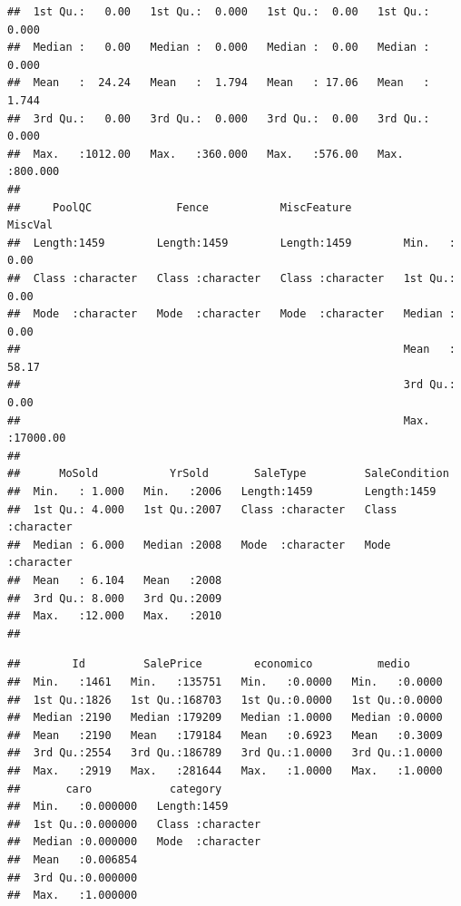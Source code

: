 \documentclass[
]{article}
\begin{document}
\begin{verbatim}
##  1st Qu.:   0.00   1st Qu.:  0.000   1st Qu.:  0.00   1st Qu.:  0.000  
##  Median :   0.00   Median :  0.000   Median :  0.00   Median :  0.000  
##  Mean   :  24.24   Mean   :  1.794   Mean   : 17.06   Mean   :  1.744  
##  3rd Qu.:   0.00   3rd Qu.:  0.000   3rd Qu.:  0.00   3rd Qu.:  0.000  
##  Max.   :1012.00   Max.   :360.000   Max.   :576.00   Max.   :800.000  
##                                                                        
##     PoolQC             Fence           MiscFeature           MiscVal        
##  Length:1459        Length:1459        Length:1459        Min.   :    0.00  
##  Class :character   Class :character   Class :character   1st Qu.:    0.00  
##  Mode  :character   Mode  :character   Mode  :character   Median :    0.00  
##                                                           Mean   :   58.17  
##                                                           3rd Qu.:    0.00  
##                                                           Max.   :17000.00  
##                                                                             
##      MoSold           YrSold       SaleType         SaleCondition     
##  Min.   : 1.000   Min.   :2006   Length:1459        Length:1459       
##  1st Qu.: 4.000   1st Qu.:2007   Class :character   Class :character  
##  Median : 6.000   Median :2008   Mode  :character   Mode  :character  
##  Mean   : 6.104   Mean   :2008                                        
##  3rd Qu.: 8.000   3rd Qu.:2009                                        
##  Max.   :12.000   Max.   :2010                                        
## 
\end{verbatim}

\begin{verbatim}
##        Id         SalePrice        economico          medio       
##  Min.   :1461   Min.   :135751   Min.   :0.0000   Min.   :0.0000  
##  1st Qu.:1826   1st Qu.:168703   1st Qu.:0.0000   1st Qu.:0.0000  
##  Median :2190   Median :179209   Median :1.0000   Median :0.0000  
##  Mean   :2190   Mean   :179184   Mean   :0.6923   Mean   :0.3009  
##  3rd Qu.:2554   3rd Qu.:186789   3rd Qu.:1.0000   3rd Qu.:1.0000  
##  Max.   :2919   Max.   :281644   Max.   :1.0000   Max.   :1.0000  
##       caro            category        
##  Min.   :0.000000   Length:1459       
##  1st Qu.:0.000000   Class :character  
##  Median :0.000000   Mode  :character  
##  Mean   :0.006854                     
##  3rd Qu.:0.000000                     
##  Max.   :1.000000
\end{verbatim}
\end{document}
